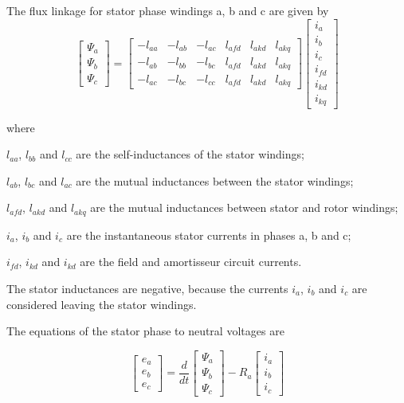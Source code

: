 The flux linkage for stator phase windings a, b and c are given by
\begin{equation}
	\begin{bmatrix}
		\Psi_a \\
		\Psi_b \\
		\Psi_c
	\end{bmatrix}
	=
	\begin{bmatrix}
		-l_{aa} & -l_{ab} & -l_{ac} & l_{afd} & l_{akd} & l_{akq} \\  
		-l_{ab} & -l_{bb} & -l_{bc} & l_{afd} & l_{akd} & l_{akq} \\  
		-l_{ac} & -l_{bc} & -l_{cc} & l_{afd} & l_{akd} & l_{akq}  
	\end{bmatrix}
	\begin{bmatrix}
		i_a \\
		i_b \\
		i_c \\
		i_{fd} \\
		i_{kd} \\
		i_{kq}
	\end{bmatrix}
\end{equation}

where

$l_{aa}$, $l_{bb}$ and $l_{cc}$ are the self-inductances of the stator windings;

$l_{ab}$, $l_{bc}$ and $l_{ac}$ are the mutual inductances between the stator windings;

$l_{afd}$, $l_{akd}$ and $l_{akq}$ are the mutual inductances between stator and rotor windings;

$i_a$, $i_b$ and $i_c$ are the instantaneous stator currents in phases a, b and c;

$i_{fd}$, $i_{kd}$ and $i_{kd}$ are the field and amortisseur circuit currents.

The stator inductances are negative, because the currents $i_a$, $i_b$ and $i_c$ are considered leaving the stator windings.
 
The equations of the stator phase to neutral voltages are

\begin{equation}
	\begin{bmatrix}
		e_a \\
		e_b \\
		e_c
	\end{bmatrix}
	=
	\frac{d}{dt}
	\begin{bmatrix}
		\Psi_a \\
		\Psi_b \\
		\Psi_c
	\end{bmatrix}
	-R_a
	\begin{bmatrix}
		i_a \\
		i_b \\
		i_c
	\end{bmatrix}
\end{equation}


